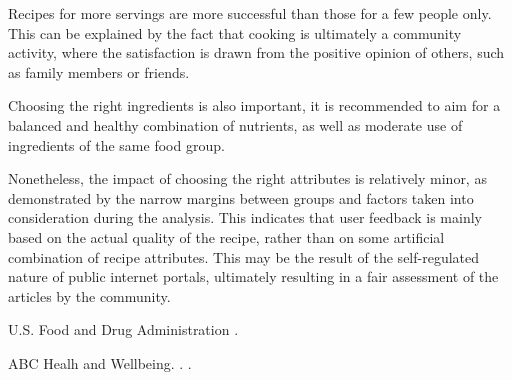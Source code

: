 \documentclass[11pt]{article}
\begin{document}
Recipes for more servings are more successful than those for a few people only. This can be explained by the fact that cooking is ultimately a community activity, where the satisfaction is drawn from the positive opinion of others, such as family members or friends.

Choosing the right ingredients is also important, it is recommended to aim for a balanced and healthy combination of nutrients, as well as moderate use of ingredients of the same food group.

Nonetheless, the impact of choosing the right attributes is relatively minor, as demonstrated by the narrow margins between groups and factors taken into consideration during the analysis. This indicates that user feedback is mainly based on the actual quality of the recipe, rather than on some artificial combination of recipe attributes. This may be the result of the self-regulated nature of public internet portals, ultimately resulting in a fair assessment of the articles by the community.

\begin{thebibliography}{}

{U.S. Food and Drug Administration}
.

{ABC Healh and Wellbeing}.
.
.

\end{thebibliography}
\end{document}
